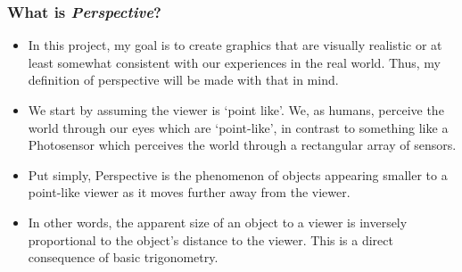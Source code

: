 \documentclass{article}
\begin{document}
\subsubsection{What is \textit{Perspective}?}
\begin{itemize}
	\item In this project, my goal is to create graphics that are visually realistic or at least somewhat consistent with our experiences in the real world. Thus, my definition of perspective will be made with that in mind.
	\item We start by assuming the viewer is `point like'. We, as humans, perceive the world through our eyes which are `point-like', in contrast to something like a Photosensor which perceives the world through a rectangular array of sensors.
	\item Put simply, Perspective is the phenomenon of objects appearing smaller to a point-like viewer as it moves further away from the viewer.
	\item In other words, the apparent size of an object to a viewer is inversely proportional to the object's distance to the viewer. This is a direct consequence of basic trigonometry.
\end{itemize}
\end{document}
